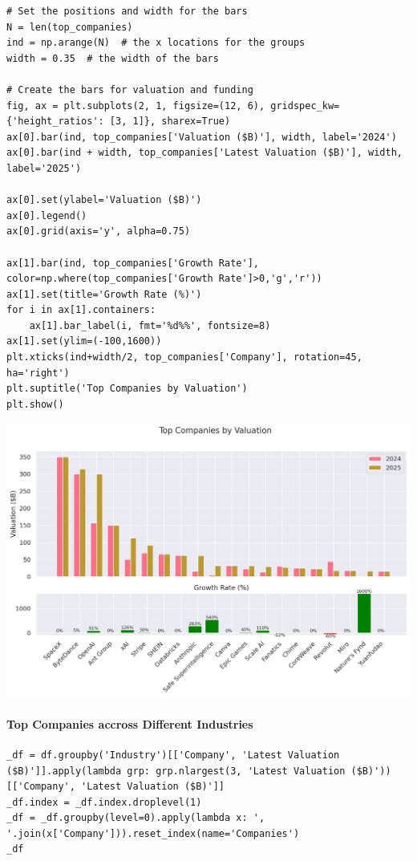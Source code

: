 \documentclass[a4paper,12pt]{article}
\begin{document}
\begin{verbatim}
# Set the positions and width for the bars
N = len(top_companies)
ind = np.arange(N)  # the x locations for the groups
width = 0.35  # the width of the bars

# Create the bars for valuation and funding
fig, ax = plt.subplots(2, 1, figsize=(12, 6), gridspec_kw={'height_ratios': [3, 1]}, sharex=True)
ax[0].bar(ind, top_companies['Valuation ($B)'], width, label='2024')
ax[0].bar(ind + width, top_companies['Latest Valuation ($B)'], width, label='2025')

ax[0].set(ylabel='Valuation ($B)')
ax[0].legend()
ax[0].grid(axis='y', alpha=0.75)

ax[1].bar(ind, top_companies['Growth Rate'], color=np.where(top_companies['Growth Rate']>0,'g','r'))
ax[1].set(title='Growth Rate (%)')
for i in ax[1].containers:
    ax[1].bar_label(i, fmt='%d%%', fontsize=8)
ax[1].set(ylim=(-100,1600))
plt.xticks(ind+width/2, top_companies['Company'], rotation=45, ha='right')
plt.suptitle('Top Companies by Valuation')
plt.show()
\end{verbatim}

\begin{center}
\includegraphics[width=.9\linewidth]{./.ob-jupyter/e5280d601c8b3020651869b90202313e8f489129.png}
\label{}
\end{center}
\paragraph{Top Companies accross Different Industries}
\label{sec:orgbcee788}
\begin{verbatim}
_df = df.groupby('Industry')[['Company', 'Latest Valuation ($B)']].apply(lambda grp: grp.nlargest(3, 'Latest Valuation ($B)'))[['Company', 'Latest Valuation ($B)']]
_df.index = _df.index.droplevel(1)
_df = _df.groupby(level=0).apply(lambda x: ', '.join(x['Company'])).reset_index(name='Companies')
_df
\end{verbatim}
\end{document}
